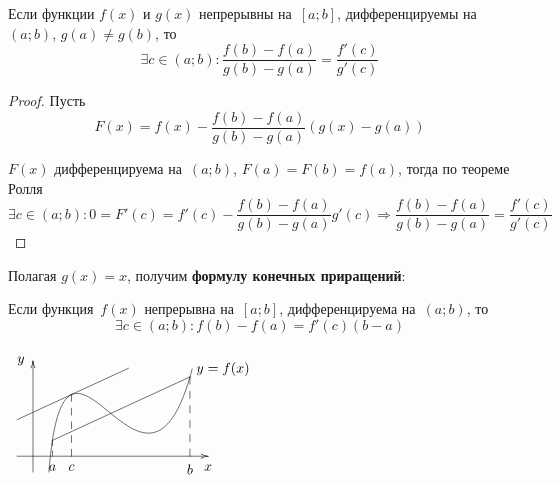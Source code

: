 \begin{theorem}
\label{th:Cauchy's_mean_value}
Если функции $f(x)$ и $g(x)$ непрерывны на~$[a; b]$, дифференцируемы на~$(a; b)$, $g(a) \neq g(b)$, то
\begin{equation*}
\exists c \in (a; b) \colon \frac{f(b) - f(a)}{g(b) - g(a)} = \frac{f'(c)}{g'(c)}
\end{equation*}
\end{theorem}
\begin{proof}
Пусть
\begin{equation*}
F(x) = f(x) - \frac{f(b) - f(a)}{g(b) - g(a)}(g(x) - g(a))
\end{equation*}

$F(x)$ дифференцируема на~$(a; b)$, $F(a) = F(b) = f(a)$, тогда по теореме Ролля
\begin{equation*}
\exists c \in (a; b) \colon 0 = F'(c) = f'(c) - \frac{f(b) - f(a)}{g(b) - g(a)} g'(c) \Rightarrow
\frac{f(b) - f(a)}{g(b) - g(a)} = \frac{f'(c)}{g'(c)}
\end{equation*}
\end{proof}

Полагая $g(x) = x$, получим \textbf{формулу конечных приращений}:
\begin{theorem}
\label{th:mean_value}
Если функция~$f(x)$ непрерывна на~$[a; b]$, дифференцируема на~$(a; b)$, то
\begin{equation*}
\exists c \in (a; b) \colon f(b) - f(a) = f'(c)(b - a)
\end{equation*}
\end{theorem}

\begin{center}
\noindent
$\begin{xy} /r8mm/:
(-0.5, 0); (5.5, 0) **@{-} *@{>} *++!U{x};
(0, -0.5); (0, 3) **@{-} *@{>} *++!R{y};
(0.5, -0.5); (5, 2.75) **\crv{(1, 6) & (3.5, -3)} *+!L{y = f(x)};
(0.6125, 0.5) = "a"; (4.93, 2.5) = "b" **@{-};
"a"; (0.6125, 0) **@{--} *++!U{a};
"b"; (4.93, 0) **@{--} *++!U{b};
(-0.5, 1.1522); (3, 2.7735) **@{-}; %
(1.21, 1.9443); (1.21, 0) **@{--} *++!U{c};
\end{xy}$
\end{center}